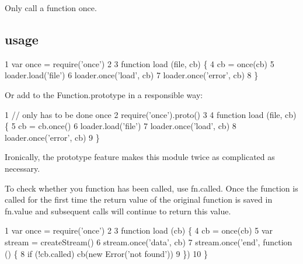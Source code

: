 Only call a function once.

\subsection*{usage}


\begin{DoxyCode}
1 var once = require('once')
2 
3 function load (file, cb) \{
4   cb = once(cb)
5   loader.load('file')
6   loader.once('load', cb)
7   loader.once('error', cb)
8 \}
\end{DoxyCode}


Or add to the Function.\+prototype in a responsible way\+:


\begin{DoxyCode}
1 // only has to be done once
2 require('once').proto()
3 
4 function load (file, cb) \{
5   cb = cb.once()
6   loader.load('file')
7   loader.once('load', cb)
8   loader.once('error', cb)
9 \}
\end{DoxyCode}


Ironically, the prototype feature makes this module twice as complicated as necessary.

To check whether you function has been called, use {\ttfamily fn.\+called}. Once the function is called for the first time the return value of the original function is saved in {\ttfamily fn.\+value} and subsequent calls will continue to return this value.


\begin{DoxyCode}
1 var once = require('once')
2 
3 function load (cb) \{
4   cb = once(cb)
5   var stream = createStream()
6   stream.once('data', cb)
7   stream.once('end', function () \{
8     if (!cb.called) cb(new Error('not found'))
9   \})
10 \}
\end{DoxyCode}
 